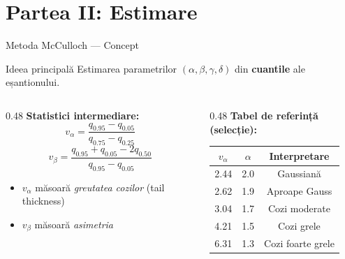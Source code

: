 \documentclass[9pt, aspectratio=169, t]{beamer}
\theoremstyle{definition}
\begin{document}
\section{Partea II: Estimare}

\begin{frame}{Metoda McCulloch --- Concept}
\begin{block}{Ideea principală}
Estimarea parametrilor $(\alpha, \beta, \gamma, \delta)$ din \textbf{cuantile} ale eșantionului.
\end{block}

\begin{columns}[T]
\begin{column}{0.48\textwidth}
\textbf{Statistici intermediare:}
$$v_\alpha = \frac{q_{0.95} - q_{0.05}}{q_{0.75} - q_{0.25}}$$
$$v_\beta = \frac{q_{0.95} + q_{0.05} - 2q_{0.50}}{q_{0.95} - q_{0.05}}$$

\vspace{0.2cm}
\begin{itemize}
    \item $v_\alpha$ măsoară \textit{greutatea cozilor} (tail thickness)
    \item $v_\beta$ măsoară \textit{asimetria}
\end{itemize}
\end{column}
\begin{column}{0.48\textwidth}
\textbf{Tabel de referință (selecție):}

\renewcommand{\arraystretch}{1.2}
\begin{tabular}{ccc}
\toprule
$v_\alpha$ & $\alpha$ & Interpretare \\
\midrule
2.44 & 2.0 & Gaussiană \\
2.62 & 1.9 & Aproape Gauss \\
3.04 & 1.7 & Cozi moderate \\
4.21 & 1.5 & Cozi grele \\
6.31 & 1.3 & Cozi foarte grele \\
\bottomrule
\end{tabular}
\end{column}
\end{columns}
\end{frame}
\end{document}
